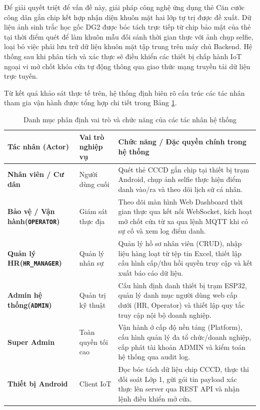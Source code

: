 \documentclass[../DoAn.tex]{subfiles}
\begin{document}
Để giải quyết triệt để vấn đề này, giải pháp công nghệ ứng dụng thẻ Căn cước công dân gắn chip kết hợp nhận diện khuôn mặt hai lớp tự trị được đề xuất. Dữ liệu ảnh sinh trắc học gốc DG2 được bóc tách trực tiếp từ chip bảo mật của thẻ tại thời điểm quét để làm khuôn mẫu đối sánh thời gian thực với ảnh chụp selfie, loại bỏ việc phải lưu trữ dữ liệu khuôn mặt tập trung trên máy chủ Backend. Hệ thống sau khi phân tích và xác thực sẽ điều khiển các thiết bị chấp hành IoT ngoại vi mở chốt khóa cửa tự động thông qua giao thức mạng truyền tải dữ liệu trực tuyến.

Từ kết quả khảo sát thực tế trên, hệ thống định biên rõ cấu trúc các tác nhân tham gia vận hành được tổng hợp chi tiết trong Bảng \ref{table:actors}.

\begin{table}[ht!]
\centering
\small
\renewcommand{\arraystretch}{1.3}
\begin{tabular}{|>{\raggedright\arraybackslash}p{2.6cm}|>{\raggedright\arraybackslash}p{2.3cm}|>{\raggedright\arraybackslash}p{8.5cm}|}
\hline
\textbf{Tác nhân (Actor)} & \textbf{Vai trò nghiệp vụ} & \textbf{Chức năng / Đặc quyền chính trong hệ thống} \\
\hline
\textbf{Nhân viên / Cư dân} & Người dùng cuối & Quét thẻ CCCD gắn chip tại thiết bị trạm Android, chụp ảnh selfie thực hiện điểm danh vào/ra và theo dõi lịch sử cá nhân. \\
\hline
\textbf{Bảo vệ / Vận hành\newline(\texttt{OPERATOR})} & Giám sát thực địa & Theo dõi màn hình Web Dashboard thời gian thực qua kết nối WebSocket, kích hoạt mở chốt cửa từ xa qua lệnh MQTT khi có sự cố và xem log điểm danh. \\
\hline
\textbf{Quản lý HR\newline(\texttt{HR\_MANAGER})} & Quản lý nhân sự & Quản lý hồ sơ nhân viên (CRUD), nhập liệu hàng loạt từ tệp tin Excel, thiết lập cấu hình cấp/thu hồi quyền truy cập và kết xuất báo cáo dữ liệu. \\
\hline
\textbf{Admin hệ thống\newline(\texttt{ADMIN})} & Quản trị kỹ thuật & Cấu hình định danh thiết bị trạm ESP32, quản lý danh mục người dùng web cấp dưới (HR, Operator) và thiết lập quy tắc truy cập nội bộ doanh nghiệp. \\
\hline
\textbf{Super Admin} & Toàn quyền tối cao & Vận hành ở cấp độ nền tảng (Platform), cấu hình quản lý đa tổ chức/doanh nghiệp, cấp phát tài khoản ADMIN và kiểm toán hệ thống qua audit log. \\
\hline
\textbf{Thiết bị Android} & Client IoT & Đọc bóc tách dữ liệu chip CCCD, thực thi đối soát Lớp 1, gửi gói tin payload xác thực lên server qua REST API và nhận lệnh điều khiển mở cửa. \\
\hline
\end{tabular}
\caption{Danh mục phân định vai trò và chức năng của các tác nhân hệ thống}
\label{table:actors}
\end{table}
\end{document}
